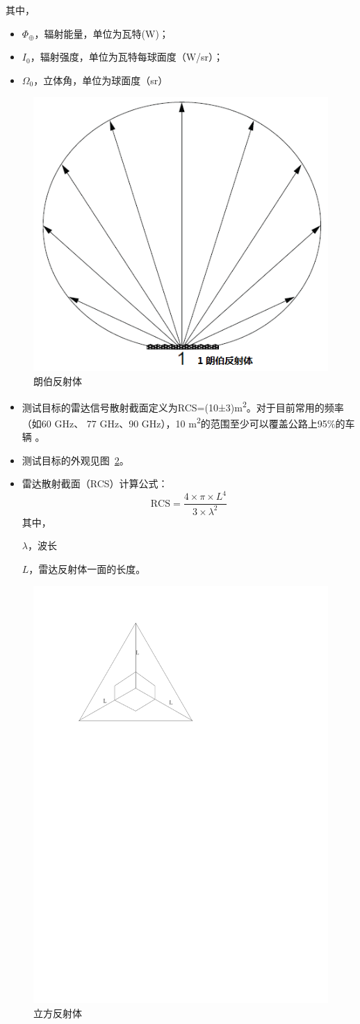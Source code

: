 \documentclass[is,copyright,is]{isov2}
\begin{document}
其中，
\begin{itemize}
	\item $\Phi_\oplus$，辐射能量，单位为瓦特(W)；
	\item $I_0$，辐射强度，单位为瓦特每球面度（W/sr）；
	\item $\varOmega_0$，立体角，单位为球面度（sr）
\end{itemize}
\begin{figure}[htbp]
	\centering
	\includegraphics[width=0.4\linewidth]{figures/lambert}
	\caption{朗伯反射体}
	\label{fig:lambert}
\end{figure}
\begin{itemize}
	\item 测试目标的雷达信号散射截面定义为RCS=(10±3)\si{m^2}。对于目前常用的频率（如60 GHz、 77 GHz、90 GHz），10 \si{m^2}的范围至少可以覆盖公路上95\%的车辆 。
	\item 测试目标的外观见图~\ref{fig:cubereflector}。
	\item 雷达散射截面（RCS）计算公式：
	\[\text{RCS} = \frac{4\times\pi\times L^4}{3\times \lambda^2}\]
	其中，
	
	$\lambda$，波长
	
	$L$，雷达反射体一面的长度。
\end{itemize}
\begin{figure}[htbp]
	\centering
	\includegraphics[width=0.4\linewidth]{figures/cubereflector}
	\caption{立方反射体}
	\label{fig:cubereflector}
\end{figure}
\bibannex
\begin{references}
	\label{ref:UN}
\end{references}
\end{document}
